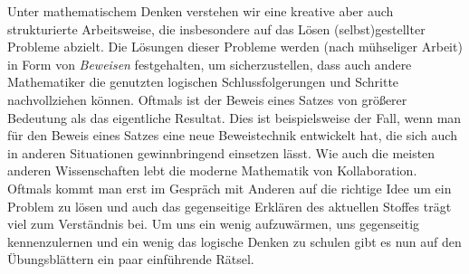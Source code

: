 Unter mathematischem Denken verstehen wir eine kreative aber auch strukturierte Arbeitsweise, die insbesondere
auf das Lösen (selbst)gestellter Probleme abzielt. Die Lösungen dieser Probleme werden (nach mühseliger Arbeit) in Form 
von \textit{Beweisen} festgehalten, um sicherzustellen, dass auch andere Mathematiker die genutzten logischen Schlussfolgerungen und Schritte nachvollziehen können.
Oftmals ist der Beweis eines Satzes von größerer Bedeutung als das eigentliche Resultat. Dies ist beispielsweise der Fall, wenn man
für den Beweis eines Satzes eine neue Beweistechnik entwickelt hat, die sich auch in anderen Situationen gewinnbringend einsetzen lässt.
Wie auch die meisten anderen Wissenschaften lebt die moderne Mathematik von Kollaboration. Oftmals kommt man erst im Gespräch mit Anderen 
auf die richtige Idee um ein Problem zu lösen und auch das gegenseitige Erklären des aktuellen Stoffes trägt viel zum Verständnis bei.
\newline 
Um uns ein wenig aufzuwärmen, uns gegenseitig kennenzulernen  und ein wenig das logische Denken zu schulen gibt es nun auf den Übungsblättern ein paar einführende Rätsel. 
